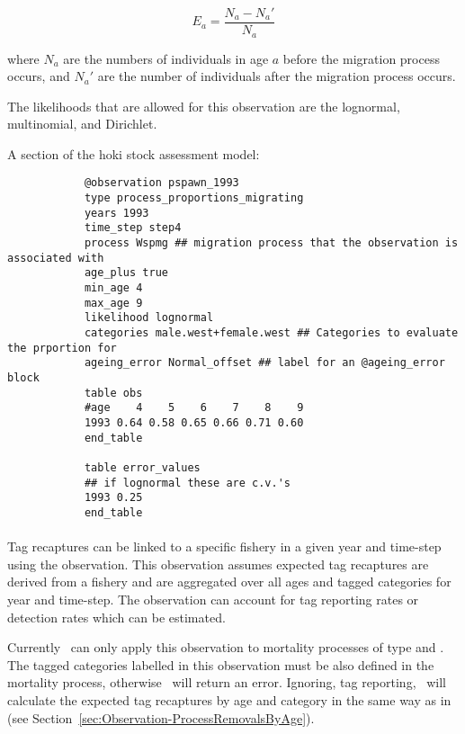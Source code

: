\begin{itemize}
	\begin{equation}
	E_a = \frac{N_a - N_a'}{N_a}
	\end{equation}
	
	where $N_a$ are the numbers of individuals in age $a$ before the migration process occurs, and $N_a'$ are the number of individuals after the migration process occurs.
	
	The likelihoods that are allowed for this observation are the lognormal, multinomial, and Dirichlet.
	
	A section of the hoki stock assessment model:
	
	{\small{\begin{verbatim}
			@observation pspawn_1993
			type process_proportions_migrating
			years 1993
			time_step step4
			process Wspmg ## migration process that the observation is associated with
			age_plus true
			min_age 4
			max_age 9
			likelihood lognormal
			categories male.west+female.west ## Categories to evaluate the prportion for
			ageing_error Normal_offset ## label for an @ageing_error block
			table obs
			#age    4    5    6    7    8    9
			1993 0.64 0.58 0.65 0.66 0.71 0.60
			end_table
			
			table error_values
			## if lognormal these are c.v.'s
			1993 0.25
			end_table
			\end{verbatim}}}
	
\end{itemize}


\paragraph*{\label{sec:Observation-TagRecaptureByFishery}}

Tag recaptures can be linked to a specific fishery in a given year and time-step using the  observation. This observation assumes expected tag recaptures are derived from a fishery and are aggregated over all ages and tagged categories for year and time-step. The observation can account for tag reporting rates or detection rates which can be estimated.

Currently \CNAME\ can only apply this observation to mortality processes of type  and . The tagged categories labelled in this observation must be also defined in the mortality process, otherwise \CNAME\ will return an error. Ignoring, tag reporting, \CNAME\ will calculate the expected tag recaptures by age and category in the same way as in  (see Section~\ref{sec:Observation-ProcessRemovalsByAge}).



